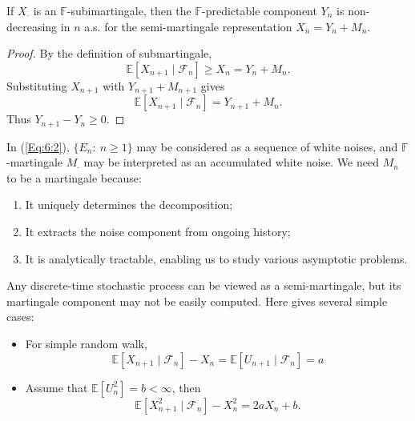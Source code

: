 \begin{corollary}
If $X_{\cdot}$ is an $\mathbb{F}$-subimartingale,
then the $\mathbb{F}$-predictable component $Y_n$ is non-decreasing in $n$ a.s. for the semi-martingale representation $X_n = Y_n+M_n$.
\end{corollary}
\begin{proof}
By the definition of submartingale,
\[
\mathbb{E}[X_{n+1}\mid\mathcal{F}_n]\ge X_n = Y_n+M_n.
\]
Substituting $X_{n+1}$ with $Y_{n+1}+M_{n+1}$ gives
\[
\mathbb{E}[X_{n+1}\mid\mathcal{F}_n] = Y_{n+1}+M_n.
\]
Thus $Y_{n+1}-Y_n\ge0$.
\end{proof}
In (\ref{Eq:6:2}), $\{E_n:~n\ge1\}$ may be considered as a sequence of white noises,
and $\mathbb{F}$-martingale $M_{\cdot}$ may be interpreted as an accumulated white noise.
We need $M_n$ to be a martingale because:
\begin{enumerate}
\item
It uniquely determines the decomposition;
\item
It extracts the noise component from ongoing history;
\item
It is analytically tractable, enabling us to study various asymptotic problems.
\end{enumerate}

Any discrete-time stochastic process can be viewed as a semi-martingale, but its martingale component may not be easily computed. Here gives several simple cases:
\begin{example}
\begin{itemize}
\item
For simple random walk,
\[
\mathbb{E}[X_{n+1}\mid\mathcal{F}_n] - X_n = \mathbb{E}[U_{n+1}\mid\mathcal{F}_n]=a
\]
\item
Assume that $\mathbb{E}[U_{n}^2]=b<\infty$, then
\[
\mathbb{E}[X_{n+1}^2\mid\mathcal{F}_n] - X_n^2=2aX_n+b.
\]
\end{itemize}
\end{example}














